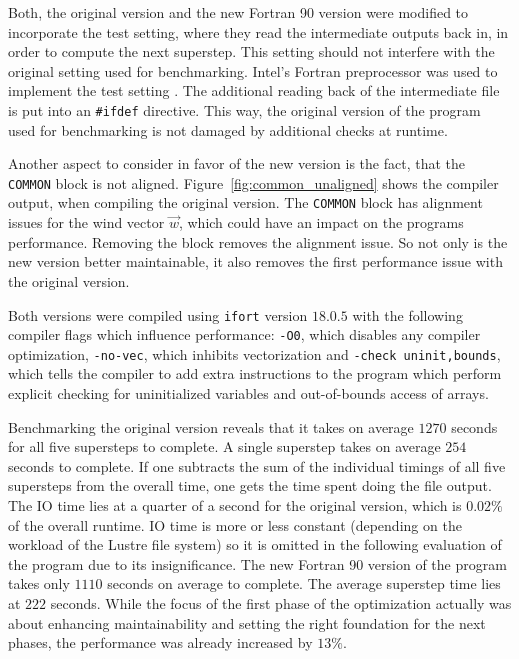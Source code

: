 \documentclass[twoside,11pt]{article}
\begin{document}
Both, the original version and the new Fortran 90 version were
modified to incorporate the test setting, where they read the
intermediate outputs back in, in order to compute the next superstep.
This setting should not interfere with the original setting
used for benchmarking.
Intel's Fortran preprocessor was used to implement the test setting
\citep{fpp}.
The additional reading back of the intermediate file is put into an
\texttt{\#ifdef} directive.
This way, the original version of the program used for benchmarking
is not damaged by additional checks at runtime.

Another aspect to consider in favor of the new version is the fact,
that the \texttt{COMMON} block is not aligned.
Figure~\ref{fig:common_unaligned} shows the compiler output, when
compiling the original version.
The \texttt{COMMON} block has alignment issues for the wind vector
$\vec{w}$, which could have an impact on the programs performance.
Removing the block removes the alignment issue.
So not only is the new version better maintainable, it also removes
the first performance issue with the original version.

Both versions were compiled using \texttt{ifort} version $18.0.5$ with
the following compiler flags which influence performance:
\texttt{-O0}, which disables any compiler optimization,
\texttt{-no-vec}, which inhibits vectorization and
\texttt{-check uninit,bounds}, which tells the compiler to add
extra instructions to the program which perform explicit checking
for uninitialized variables and out-of-bounds access of arrays.

Benchmarking the original version reveals that it takes on average
$1270$ seconds for all five supersteps to complete.
A single superstep takes on average $254$ seconds to complete.
If one subtracts the sum of the individual timings of all five
supersteps from the overall time, one gets the time spent doing the
file output.
The IO time lies at a quarter of a second for the original version,
which is $0.02\%$ of the overall runtime.
IO time is more or less constant (depending on the workload of the
Lustre file system) so it is omitted in the following evaluation of
the program due to its insignificance.
The new Fortran 90 version of the program takes only $1110$ seconds
on average to complete.
The average superstep time lies at $222$ seconds.
While the focus of the first phase of the optimization actually was
about enhancing maintainability and setting the right foundation for
the next phases, the performance was already increased by $13\%$.
\end{document}

